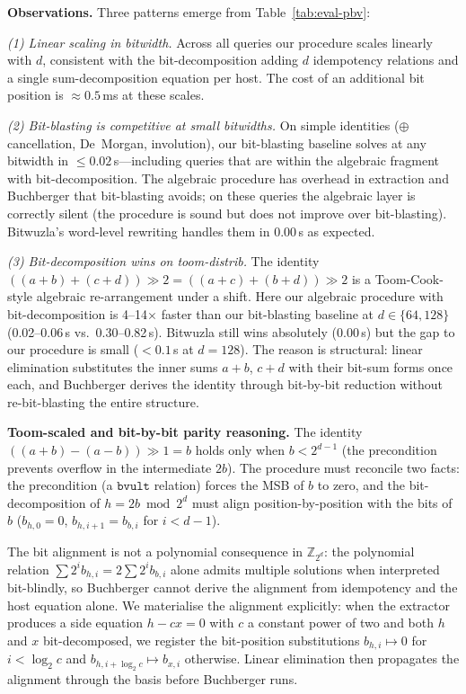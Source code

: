 \documentclass[runningheads]{llncs}
\begin{document}
\textbf{Observations.} Three patterns emerge from
Table~\ref{tab:eval-pbv}:

\emph{(1) Linear scaling in bitwidth.} Across all queries our
procedure scales linearly with $d$, consistent with the
bit-decomposition adding $d$ idempotency relations and a single
sum-decomposition equation per host. The cost of an additional
bit position is $\approx 0.5$\,ms at these scales.

\emph{(2) Bit-blasting is competitive at small bitwidths.} On
simple identities ($\oplus$ cancellation, De~Morgan,
involution), our bit-blasting baseline solves at any bitwidth in
$\leq 0.02$\,s---including queries that are within the algebraic
fragment with bit-decomposition. The algebraic procedure has
overhead in extraction and Buchberger that bit-blasting avoids;
on these queries the algebraic layer is correctly silent
(the procedure is sound but does not improve over bit-blasting).
Bitwuzla's word-level rewriting handles them in 0.00\,s as
expected.

\emph{(3) Bit-decomposition wins on toom-distrib.} The identity
$((a{+}b){+}(c{+}d)) \gg 2 = ((a{+}c){+}(b{+}d)) \gg 2$ is a
Toom-Cook-style algebraic re-arrangement under a shift. Here our
algebraic procedure with bit-decomposition is 4--14$\times$
faster than our bit-blasting baseline at $d \in \{64, 128\}$
(0.02--0.06\,s vs.\ 0.30--0.82\,s). Bitwuzla still wins
absolutely (0.00\,s) but the gap to our procedure is small
($<\!0.1$\,s at $d = 128$). The reason is structural: linear
elimination substitutes the inner sums $a{+}b$, $c{+}d$ with
their bit-sum forms once each, and Buchberger derives the
identity through bit-by-bit reduction without re-bit-blasting
the entire structure.

\textbf{Toom-scaled and bit-by-bit parity reasoning.} The
identity $((a{+}b){-}(a{-}b)) \gg 1 = b$ holds only when
$b < 2^{d-1}$ (the precondition prevents overflow in the
intermediate $2b$). The procedure must reconcile two facts:
the precondition (a $\mathtt{bvult}$ relation) forces the MSB
of $b$ to zero, and the bit-decomposition of $h = 2b \bmod 2^d$
must align position-by-position with the bits of $b$
($b_{h,0} = 0$, $b_{h,i+1} = b_{b,i}$ for $i < d-1$).

The bit alignment is not a polynomial consequence in
$\mathbb{Z}_{2^d}$: the polynomial relation
$\sum 2^i b_{h,i} = 2 \sum 2^i b_{b,i}$ alone admits multiple
solutions when interpreted bit-blindly, so Buchberger cannot
derive the alignment from idempotency and the host equation
alone. We materialise the alignment explicitly: when the
extractor produces a side equation $h - c x = 0$ with $c$ a
constant power of two and both $h$ and $x$ bit-decomposed, we
register the bit-position substitutions
$b_{h,i} \mapsto 0$ for $i < \log_2 c$ and
$b_{h,i + \log_2 c} \mapsto b_{x,i}$ otherwise. Linear
elimination then propagates the alignment through the basis
before Buchberger runs.
\end{document}
